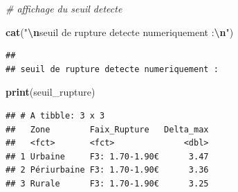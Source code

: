 \documentclass[
]{article}
\newenvironment{Shaded}{\begin{snugshade}}{\end{snugshade}}
\newcommand{\CommentTok}[1]{\textcolor[rgb]{0.56,0.35,0.01}{\textit{#1}}}
\newcommand{\FunctionTok}[1]{\textcolor[rgb]{0.13,0.29,0.53}{\textbf{#1}}}
\newcommand{\NormalTok}[1]{#1}
\newcommand{\SpecialCharTok}[1]{\textcolor[rgb]{0.81,0.36,0.00}{\textbf{#1}}}
\newcommand{\StringTok}[1]{\textcolor[rgb]{0.31,0.60,0.02}{#1}}
\begin{document}
\begin{Shaded}
\begin{Highlighting}[]
\CommentTok{\# affichage du seuil detecte}

\FunctionTok{cat}\NormalTok{(}\StringTok{"}\SpecialCharTok{\textbackslash{}n}\StringTok{seuil de rupture detecte numeriquement :}\SpecialCharTok{\textbackslash{}n}\StringTok{"}\NormalTok{)}
\end{Highlighting}
\end{Shaded}

\begin{verbatim}
## 
## seuil de rupture detecte numeriquement :
\end{verbatim}

\begin{Shaded}
\begin{Highlighting}[]
\FunctionTok{print}\NormalTok{(seuil\_rupture)}
\end{Highlighting}
\end{Shaded}

\begin{verbatim}
## # A tibble: 3 x 3
##   Zone        Faix_Rupture   Delta_max
##   <fct>       <fct>              <dbl>
## 1 Urbaine     F3: 1.70-1.90€      3.47
## 2 Périurbaine F3: 1.70-1.90€      3.36
## 3 Rurale      F3: 1.70-1.90€      3.25
\end{verbatim}
\end{document}
